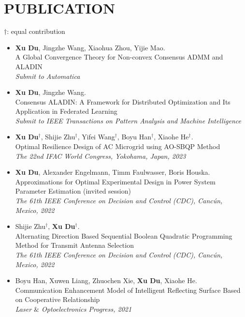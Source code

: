 \documentclass[paper=a4,fontsize=11pt]{scrartcl} %
\newcommand{\NewPart}[1]{\section*{\uppercase{#1}}}
\newcommand{\EducationEntry}[4]{
	\noindent \textbf{#1} \hfill      %
	\colorbox{White}{%
		\parbox{5cm}{%
			\hfill\color{Black}#2}} \par  %
	\noindent \textit{#3} \par        %
	\noindent\hangindent=2em\hangafter=0 \small #4 %
	\normalsize \par}
\begin{document}
		
		\NewPart{PUBLICATION}{}
		$\dag$:  equal contribution
		\begin{itemize}
				\item  { \textbf{Xu Du}, Jingzhe Wang, Xiaohua Zhou, Yijie Mao. \\
				{A Global Convergence Theory for Non-convex Consensus ADMM and ALADIN}\\
				\emph{ Submit to Automatica
			} }
			
			\item  { \textbf{Xu Du}, Jingzhe Wang. \\
				{Consensus ALADIN: A Framework for
					Distributed Optimization and Its Application in
					Federated Learning}\\
				\emph{ Submit to IEEE Transactions on Pattern Analysis and Machine Intelligence
			} }
			
			
			\item  { \textbf{Xu Du}$^{\dag}$, Shijie Zhu$^{\dag}$, Yifei Wang$^{\dag}$, Boyu Han$^{\dag}$, Xiaohe He$^{\dag}$. \\
				{Optimal Resilience Design of AC Microgrid
					using AO-SBQP Method}\\
				\emph{ The 22nd IFAC World Congress, Yokohama, Japan, 2023
			} }
			
			\item  { \textbf{Xu Du}, Alexander Engelmann, Timm Faulwasser, Boris Houska. \\
				{Approximations for Optimal Experimental Design
					in Power System Parameter Estimation (invited session)}\\
				\emph{ The 61th IEEE Conference on Decision and Control (CDC), Canc\'un, Mexico, 2022
			} }
			
			
			\item  { Shijie Zhu$^{\dag}$, \textbf{Xu Du}$^{\dag}$. \\
				{Alternating Direction Based Sequential Boolean Quadratic Programming Method for Transmit Antenna Selection}\\
				\emph{ The 61th IEEE Conference on Decision and Control (CDC), Canc\'un, Mexico, 2022
			} }
			
			\item  { Boyu Han, Xuwen Liang, Zhuochen Xie, \textbf{Xu Du}, Xiaohe He. \\
				{Communication Enhancement Model of Intelligent Reflecting Surface Based on Cooperative Relationship}\\
				\emph{Laser $\&$ Optoelectronics Progress, 2021
			} }
			

\end{itemize}
\end{document}
